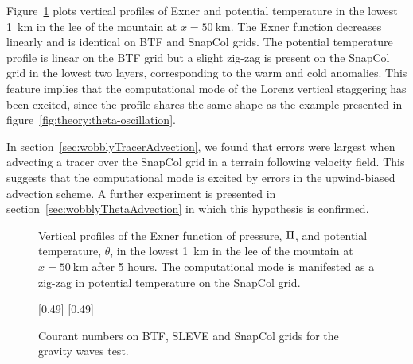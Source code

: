 Figure~\ref{fig:gw:exner-theta} plots vertical profiles of Exner and potential temperature in the lowest \SI{1}{\kilo\meter} in the lee of the mountain at $x = \SI{50}{\kilo\meter}$.  The Exner function decreases linearly and is identical on BTF and SnapCol grids.  The potential temperature profile is linear on the BTF grid but a slight zig-zag is present on the SnapCol grid in the lowest two layers, corresponding to the warm and cold anomalies.  
This feature implies that the computational mode of the Lorenz vertical staggering has been excited, since the profile shares the same shape as the example presented in figure~\ref{fig:theory:theta-oscillation}.

In section~\ref{sec:wobblyTracerAdvection}, we found that errors were largest when advecting a tracer over the SnapCol grid in a terrain following velocity field.  This suggests that the computational mode is excited by errors in the upwind-biased advection scheme.  A further experiment is presented in section~\ref{sec:wobblyThetaAdvection} in which this hypothesis is confirmed.


\begin{figure}
	\centering
	
	\caption{Vertical profiles of the Exner function of pressure, $\Pi$, and potential temperature, $\theta$, in the lowest \SI{1}{\kilo\meter} in the lee of the mountain at $x = \SI{50}{\kilo\meter}$ after 5 hours.  The computational mode is manifested as a zig-zag in potential temperature on the SnapCol grid.}
	\label{fig:gw:exner-theta}
\end{figure}


\begin{figure}
	\captionsetup[subfigure]{position=b}
	\centering
	[0.49\textwidth]{}
	\hfill
	[0.49\textwidth]{}
	\caption{Courant numbers on BTF, SLEVE and SnapCol grids for the gravity waves test.}
	\label{fig:gw:courant}
\end{figure}

